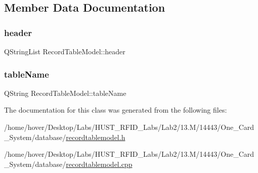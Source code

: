 \subsection{Member Data Documentation}
\mbox{\label{class_record_table_model_aa1e8b825bbdee1a7cb35a236b767cded}} 
\subsubsection{\texorpdfstring{header}{header}}
{\footnotesize\ttfamily Q\+String\+List Record\+Table\+Model\+::header\hspace{0.3cm}{\ttfamily [private]}}

\mbox{\label{class_record_table_model_a845184d414cef77094c51f2ce839ff8e}} 
\subsubsection{\texorpdfstring{tableName}{tableName}}
{\footnotesize\ttfamily Q\+String Record\+Table\+Model\+::table\+Name\hspace{0.3cm}{\ttfamily [private]}}



The documentation for this class was generated from the following files\+:\begin{DoxyCompactItemize}
\item 
/home/hover/\+Desktop/\+Labs/\+H\+U\+S\+T\+\_\+\+R\+F\+I\+D\+\_\+\+Labs/\+Lab2/13.\+M/14443/\+One\+\_\+\+Card\+\_\+\+System/database/\mbox{\hyperlink{recordtablemodel_8h}{recordtablemodel.\+h}}\item 
/home/hover/\+Desktop/\+Labs/\+H\+U\+S\+T\+\_\+\+R\+F\+I\+D\+\_\+\+Labs/\+Lab2/13.\+M/14443/\+One\+\_\+\+Card\+\_\+\+System/database/\mbox{\hyperlink{recordtablemodel_8cpp}{recordtablemodel.\+cpp}}\end{DoxyCompactItemize}
